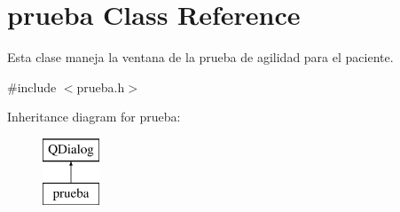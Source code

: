 \hypertarget{classprueba}{}\section{prueba Class Reference}
\label{classprueba}


Esta clase maneja la ventana de la prueba de agilidad para el paciente.  




{\ttfamily \#include $<$prueba.\+h$>$}

Inheritance diagram for prueba\+:\begin{figure}[H]
\begin{center}
\leavevmode
\includegraphics[height=2.000000cm]{classprueba}
\end{center}
\end{figure}
